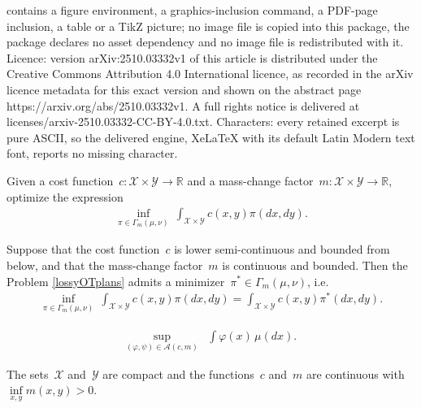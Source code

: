 \documentclass[10pt,a4paper]{amsart}
\begin{document}
contains a figure environment, a graphics-inclusion command, a PDF-page inclusion, a table or a TikZ picture; no image file is copied into this package, the package declares no asset dependency and no image file is redistributed with it. Licence: version arXiv:2510.03332v1 of this article is distributed under the Creative Commons Attribution 4.0 International licence, as recorded in the arXiv licence metadata for this exact version and shown on the abstract page https://arxiv.org/abs/2510.03332v1. A full rights notice is delivered at licenses/arxiv-2510.03332-CC-BY-4.0.txt. Characters: every retained excerpt is pure ASCII, so the delivered engine, XeLaTeX with its default Latin Modern text font, reports no missing character.
\begin{definition} \label{lossyOTplans}
 Given a cost function~$c: \mathcal X \times \mathcal{Y} \to \mathbb{R}$ and  a mass-change factor~$m: \mathcal{X} \times \mathcal{Y} \to \mathbb{R}$, optimize the expression
\begin{align}
\inf_{\pi \in \Gamma_m(\mu, \nu)}  \ \int_{\mathcal{X} \times \mathcal{Y} } c(x,y) \pi(dx,dy) .   \tag{KP}   \label{equ:katorovich_problem}
\end{align}
\end{definition}

\begin{theorem}\label{the:solution_KP}
	Suppose that the cost function~$c$ is lower semi-continuous and bounded from below, and that the mass-change factor~$m$ is continuous and bounded. Then the Problem \ref{lossyOTplans} admits a minimizer~$\pi^* \in \Gamma_m(\mu, \nu) $, i.e.
    \begin{align}
        \inf_{\pi \in \Gamma_m(\mu, \nu)}  \ \int_{\mathcal{X} \times \mathcal{Y} } c(x,y) \pi(dx,dy)  =   \int_{\mathcal{X} \times \mathcal{Y} } c(x,y) \pi^*(dx,dy).
    \end{align}
\end{theorem}

\begin{align}
  \sup_{(\varphi, \psi) \in \mathcal{A}(c,m)}&
 \int \varphi(x)\,\mu(dx) . \tag{DP} \label{equ:dual_KP} 
\end{align}

\begin{assumption}\label{asu:existence_optimal_potentials}
  The sets~$\mathcal{X}$ and~$\mathcal{Y}$ are compact and the functions~$c$ and~$m$ are continuous with~$\inf\limits_{x,y}m(x,y)>0$.   
\end{assumption}
\end{document}

